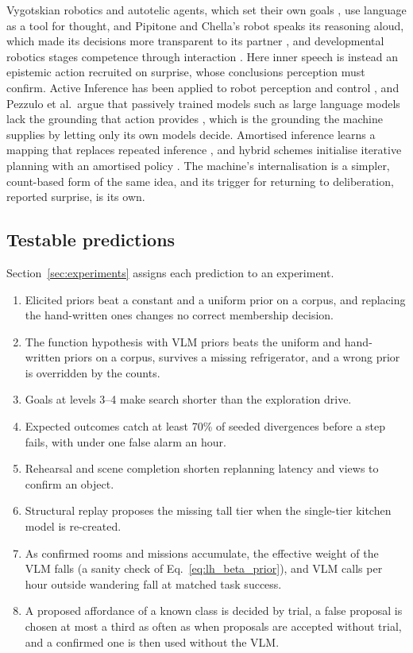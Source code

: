 Vygotskian robotics \cite{mirolli2011towards} and autotelic agents, which set their own goals \cite{colas2022language}, use language as a tool for
thought, and Pipitone and Chella's robot speaks its reasoning aloud, which made its decisions more transparent to its
partner \cite{pipitone2021robots}, and developmental robotics stages competence through interaction \cite{cangelosi2015developmental}. Here inner speech is instead an epistemic action recruited on surprise, whose
conclusions perception must confirm. Active Inference
has been applied to robot perception and control \cite{lanillos2021active}, and Pezzulo et al.\ argue that passively
trained models such as large language models lack the grounding that action provides \cite{pezzulo2024generating},
which is the grounding the machine supplies by letting only its own models decide. Amortised inference learns a
mapping that replaces repeated inference \cite{gershman2014amortized}, and hybrid schemes initialise iterative
planning with an amortised policy \cite{tschantz2020control}. The machine's internalisation is a simpler,
count-based form of the same idea, and its trigger for returning to deliberation, reported surprise, is its own.

\subsection{Testable predictions}
\label{sec:lang_hierarchy:predictions}

Section~\ref{sec:experiments} assigns each prediction to an experiment.
\begin{enumerate}[label=\textbf{L\arabic*}, start=0]
    \item Elicited priors beat a constant and a uniform prior on a corpus, and replacing the hand-written ones changes no correct membership decision.
    \item The function hypothesis with VLM priors beats the uniform and hand-written priors on a corpus, survives a missing refrigerator, and a wrong prior is
    overridden by the counts.
    \item Goals at levels 3--4 make search shorter than the exploration drive.
    \item Expected outcomes catch at least 70\% of seeded divergences before a step fails, with under one false alarm an hour.
    \item Rehearsal and scene completion shorten replanning latency and views to confirm an object.
    \item Structural replay proposes the missing tall tier when the single-tier kitchen model is re-created.
    \item As confirmed rooms and missions accumulate, the effective weight of the VLM falls (a sanity check of Eq.~\eqref{eq:lh_beta_prior}), and VLM calls per hour
    outside wandering fall at matched task success.
    \item A proposed affordance of a known class is decided by trial, a false proposal is chosen at most a third as
    often as when proposals are accepted without trial, and a confirmed one is then used without the VLM.
\end{enumerate}

